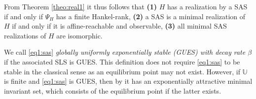 \documentclass[journal,twoside,web]{ieeecolor}
\begin{document}
     From Theorem \ref{theo:real1} it thus follows \cite{Son:Real}
     that  \textbf{(1)} $H$ has a realization by a SAS if and only 
     if $\Psi_H$ has a finite Hankel-rank, \textbf{(2)} a SAS is a minimal realization of $H$ 
     if and only if it is affine-reachable and observable, \textbf{(3)} all minimal SAS realizations of $H$ are isomorphic. 

     We  call \eqref{eq1:sas} \emph{globally uniformly exponentially stable (GUES) with decay rate $\beta$} if 
     the associated SLS is GUES. 
      This definition does not require \eqref{eq1:sas} to be stable in the classical sense as an equilibrium point may not exist. However, if $\mathbb{U}$ is finite and \eqref{eq1:sas} is GUES, then by \cite{ATHANASOPOULOS2016158,Rossa2023} it has an exponentially attractive minimal invariant set, which consists of the equilibrium point if the latter exists.
     
\end{document}
